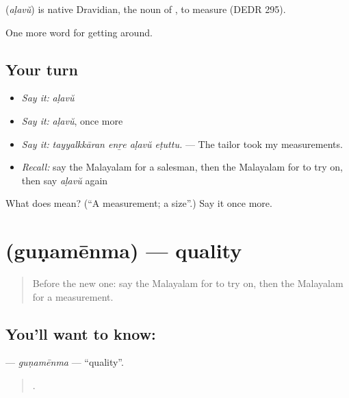 \begin{cousinweb}
\textbf{} (\emph{aḷavŭ}) is native Dravidian, the noun of , to measure (DEDR 295).
\end{cousinweb}

\begin{grammarlens}[title={What you've built}]
One more word for getting around.
\end{grammarlens}

\subsection*{Your turn}
\begin{itemize}
\raggedright
  \item \emph{Say it:} \emph{aḷavŭ}
  \item \emph{Say it:} \emph{aḷavŭ}, once more
  \item \emph{Say it:} \emph{tayyalkkāran enṟe aḷavŭ eṭuttu.} — The tailor took my measurements.
  \item \emph{Recall:} say the Malayalam for a salesman, then the Malayalam for to try on, then say \emph{aḷavŭ} again
\end{itemize}

\begin{tcolorbox}[breakable,colback=teal!4,colframe=teal!35!black,title={Before you move on}]
What does  mean? (\textquotedblleft{}A measurement; a size\textquotedblright{}.) Say it once more.
\end{tcolorbox}
\section[\texorpdfstring{\ml{ഗുണമേന്മ} (guṇamēnma)}{ഗുണമേന്മ (guṇamēnma)}]{ (guṇamēnma) — quality}

\label{lesson:ML-C492-gunamenma}



\begin{quote}
Before the new one: say the Malayalam for to try on, then the Malayalam for a measurement.
\end{quote}

\subsection*{You'll want to know: }
\textbf{} — \emph{guṇamēnma} — \textquotedblleft{}quality\textquotedblright{}.

\begin{quote}
    .
\end{quote}

